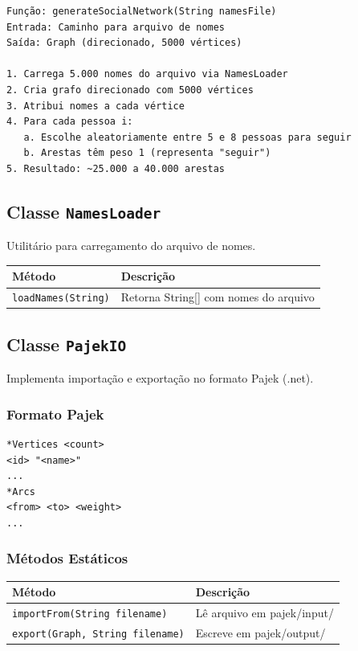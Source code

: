 \documentclass[12pt,a4paper]{article}
\begin{document}
    \begin{verbatim}
Função: generateSocialNetwork(String namesFile)
Entrada: Caminho para arquivo de nomes
Saída: Graph (direcionado, 5000 vértices)

1. Carrega 5.000 nomes do arquivo via NamesLoader
2. Cria grafo direcionado com 5000 vértices
3. Atribui nomes a cada vértice
4. Para cada pessoa i:
   a. Escolhe aleatoriamente entre 5 e 8 pessoas para seguir
   b. Arestas têm peso 1 (representa "seguir")
5. Resultado: ~25.000 a 40.000 arestas
    \end{verbatim}

    \subsection{Classe \texttt{NamesLoader}}

    Utilitário para carregamento do arquivo de nomes.

    \begin{table}[h]
        \centering
        \begin{tabular}{|l|l|}
            \hline
            \textbf{Método} & \textbf{Descrição} \\
            \hline
            \texttt{loadNames(String)} & Retorna String[] com nomes do arquivo \\
            \hline
        \end{tabular}
    \end{table}

    \subsection{Classe \texttt{PajekIO}}

    Implementa importação e exportação no formato Pajek (.net).

    \subsubsection{Formato Pajek}

    \begin{verbatim}
*Vertices <count>
<id> "<name>"
...
*Arcs
<from> <to> <weight>
...
    \end{verbatim}

    \subsubsection{Métodos Estáticos}

    \begin{table}[h]
        \centering
        \begin{tabular}{|l|l|}
            \hline
            \textbf{Método} & \textbf{Descrição} \\
            \hline
            \texttt{importFrom(String filename)} & Lê arquivo em pajek/input/ \\
            \hline
            \texttt{export(Graph, String filename)} & Escreve em pajek/output/ \\
            \hline
        \end{tabular}
    \end{table}
\end{document}
